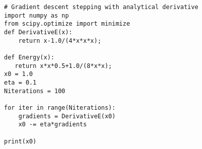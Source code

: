 \begin{verbatim}
# Gradient descent stepping with analytical derivative
import numpy as np
from scipy.optimize import minimize
def DerivativeE(x):
    return x-1.0/(4*x*x*x);

def Energy(x):
   return x*x*0.5+1.0/(8*x*x);
x0 = 1.0
eta = 0.1
Niterations = 100

for iter in range(Niterations):
    gradients = DerivativeE(x0)
    x0 -= eta*gradients

print(x0)

\end{verbatim}
























































































